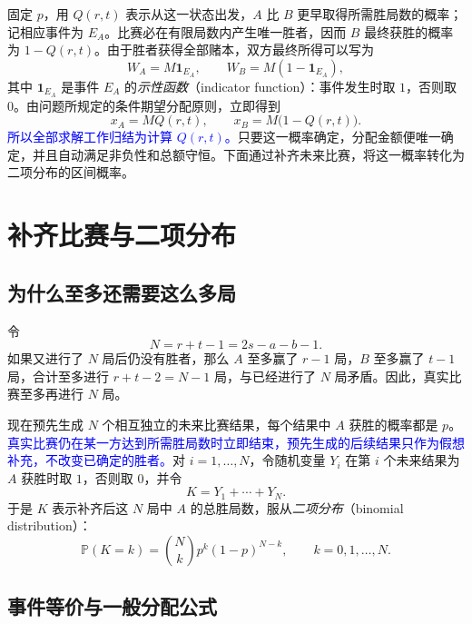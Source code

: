\documentclass[UTF8,12pt,a4paper,fontset=fandol]{ctexart}
\begin{document}
固定 $p$，用 $Q(r,t)$ 表示从这一状态出发，$A$ 比 $B$ 更早取得所需胜局数的概率；记相应事件为 $E_A$。比赛必在有限局数内产生唯一胜者，因而 $B$ 最终获胜的概率为 $1-Q(r,t)$。由于胜者获得全部赌本，双方最终所得可以写为
\[
  W_A=M\mathbf 1_{E_A},\qquad W_B=M(1-\mathbf 1_{E_A}),
\]
其中 $\mathbf 1_{E_A}$ 是事件 $E_A$ 的\emph{示性函数}（indicator function）：事件发生时取 $1$，否则取 $0$。由问题所规定的条件期望分配原则，立即得到
\begin{equation}
  x_A=M Q(r,t),\qquad x_B=M\bigl(1-Q(r,t)\bigr).
  \label{eq:points-allocation}
\end{equation}
\textcolor{blue}{所以全部求解工作归结为计算 $Q(r,t)$。}只要这一概率确定，分配金额便唯一确定，并且自动满足非负性和总额守恒。下面通过补齐未来比赛，将这一概率转化为二项分布的区间概率。

\section{补齐比赛与二项分布}
\label{sec:points-binomial}

\subsection{为什么至多还需要这么多局}

令
\begin{equation}
  N=r+t-1=2s-a-b-1.
  \label{eq:points-horizon}
\end{equation}
如果又进行了 $N$ 局后仍没有胜者，那么 $A$ 至多赢了 $r-1$ 局，$B$ 至多赢了 $t-1$ 局，合计至多进行 $r+t-2=N-1$ 局，与已经进行了 $N$ 局矛盾。因此，真实比赛至多再进行 $N$ 局。

现在预先生成 $N$ 个相互独立的未来比赛结果，每个结果中 $A$ 获胜的概率都是 $p$。\textcolor{blue}{真实比赛仍在某一方达到所需胜局数时立即结束，预先生成的后续结果只作为假想补充，不改变已确定的胜者。}对 $i=1,\ldots,N$，令随机变量 $Y_i$ 在第 $i$ 个未来结果为 $A$ 获胜时取 $1$，否则取 $0$，并令
\[
  K=Y_1+\cdots+Y_N.
\]
于是 $K$ 表示补齐后这 $N$ 局中 $A$ 的总胜局数，服从\emph{二项分布}（binomial distribution）：
\begin{equation}
  \mathbb P(K=k)=\binom Nk p^k(1-p)^{N-k},
  \qquad k=0,1,\ldots,N.
  \label{eq:points-binomial-mass}
\end{equation}

\subsection{事件等价与一般分配公式}
\end{document}
